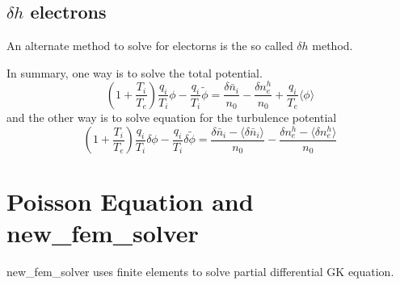 \documentclass{report}
\newcommand{\ff}[2]{\frac{#1}{#2}}
\begin{document}
\subsection{$\delta h$ electrons}
\fi


An alternate method to solve for electorns is the so called $\delta h$ method.

In summary,
one way is to solve the total potential.
\begin{equation}
\label{eq:2a}
\left( 1 + \ff{T_i}{T_e} \right)
\ff{q_i}{T_i} \phi- 
\ff{q_i}{T_i} \tilde{\phi}
= \ff{\delta \bar{n}_i}{n_0} - \ff{\delta n_e^h}{n_0}
  + \ff{q_i}{T_e} \langle \phi \rangle
\end{equation}
and
the other way is to solve equation for the turbulence potential %
\begin{equation}
\label{eq:2b}
\left( 1 + \ff{T_i}{T_e} \right)
\ff{q_i }{T_i} \delta \phi - 
\ff{q_i }{T_i} \delta \tilde{\phi}
= 
 \ff{\delta \bar{n}_i - \langle \delta \bar{n}_i \rangle}{n_0} - 
 \ff{\delta n_e^h - \langle \delta n_e^h \rangle}{n_0}
\end{equation}
 

\section{Poisson Equation and new\_fem\_solver}
\label{sec:new_fem_solver}
new\_fem\_solver uses finite elements to solve partial differential GK equation.
\end{document}
